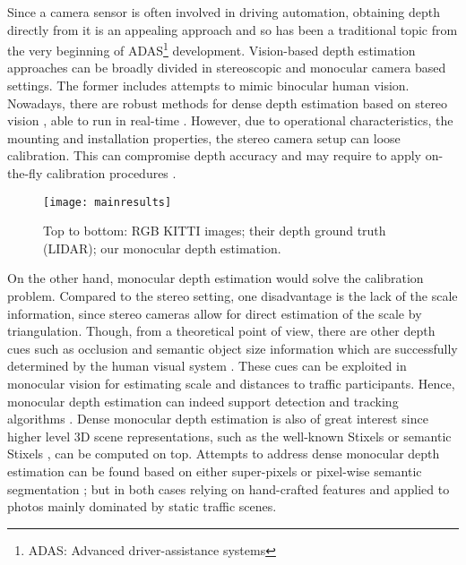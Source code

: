 \documentclass[letterpaper, 10 pt, conference]{ieeeconf}
\begin{document}
Since a camera sensor is often involved in driving automation, obtaining depth directly from it is an appealing approach and so has been a traditional topic from the very beginning of ADAS\footnote{ADAS: Advanced driver-assistance systems} development. Vision-based depth estimation approaches can be broadly divided in stereoscopic and monocular camera based settings. The former includes attempts to mimic binocular human vision. Nowadays, there are robust methods for dense depth estimation based on stereo vision \cite{Hirschmuller:2008}, able to run in real-time \cite{Hernandez:2016}. However, due to operational characteristics, the mounting and installation properties, the stereo camera setup can loose calibration. This can compromise depth accuracy and may require to apply on-the-fly calibration procedures \cite{Dang:2009, Rehder:2017}. 

\begin{figure}[t!]
\centering
\texttt{[image: mainresults]}
\caption{Top to bottom: RGB KITTI images; their depth ground truth (LIDAR); our monocular depth estimation.}
\label{fig:mainresults}
\end{figure}

On the other hand, monocular depth estimation would solve the calibration problem. Compared to the stereo setting, one disadvantage is the lack of the scale information, since stereo cameras allow for direct estimation of the scale by triangulation. Though, from a theoretical point of view, there are other depth cues such as occlusion and semantic object size information which are successfully determined by the human visual system \cite{Cutting:1995}. These cues can be exploited in monocular vision for estimating scale and distances to traffic participants. Hence, monocular depth estimation can indeed support detection and tracking algorithms \cite{Ponsa:2005, Hoiem:2008, Cheda:2012}. Dense monocular depth estimation is also of great interest since higher level 3D scene representations, such as the well-known Stixels \cite{Badino:2009, Hernandez:2017} or semantic Stixels \cite{Schneider:2016}, can be computed on top. Attempts to address dense monocular depth estimation can be found based on either super-pixels \cite{Saxena:2009} or pixel-wise semantic segmentation \cite{Liu:2010}; but in both cases relying on hand-crafted features and applied to photos mainly dominated by static traffic scenes.
\end{document}
